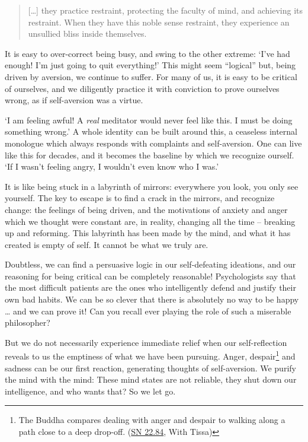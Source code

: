 \begin{quote}
{[}\ldots{]} they practice restraint, protecting the faculty of mind,
and achieving its restraint. When they have this noble sense restraint,
they experience an unsullied bliss inside themselves.

\bigskip

\end{quote}


It is easy to over-correct being busy, and swing to the other extreme:
`I've had enough! I'm just going to quit everything!' This might seem
``logical'' but, being driven by aversion, we continue to suffer. For
many of us, it is easy to be critical of ourselves, and we diligently
practice it with conviction to prove ourselves wrong, as if
self-aversion was a virtue.

`I am feeling awful! A \emph{real} meditator would never feel like this.
I must be doing something wrong.' A whole identity can be built around
this, a ceaseless internal monologue which always responds with
complaints and self-aversion. One can live like this for decades, and it
becomes the baseline by which we recognize ourself. `If I wasn't feeling
angry, I wouldn't even know who I was.'

It is like being stuck in a labyrinth of mirrors: everywhere you look,
you only see yourself. The key to escape is to find a crack in the
mirrors, and recognize change: the feelings of being driven, and the
motivations of anxiety and anger which we thought were constant are, in
reality, changing all the time -- breaking up and reforming. This
labyrinth has been made by the mind, and what it has created is empty of
self. It cannot be what we truly are.

Doubtless, we can find a persuasive logic in our self-defeating
ideations, and our reasoning for being critical can be completely
reasonable! Psychologists say that the most difficult patients are the
ones who intelligently defend and justify their own bad habits. We can
be so clever that there is absolutely no way to be happy \ldots{} and we
can prove it! Can you recall ever playing the role of such a miserable
philosopher?

But we do not necessarily experience immediate relief when our
self-reflection reveals to us the emptiness of what we have been
pursuing. Anger, despair\footnote{The Buddha compares dealing with anger
  and despair to walking along a path close to a deep drop-off.
  (\href{https://suttacentral.net/sn22.84}{SN 22.84}, With Tissa)} and
sadness can be our first reaction, generating thoughts of self-aversion.
We purify the mind with the mind: These mind states are not reliable,
they shut down our intelligence, and who wants that? So we let go.

